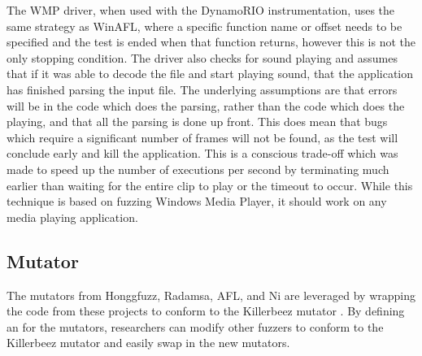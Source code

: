 The WMP driver, when used with the DynamoRIO instrumentation, uses the same strategy as WinAFL, where a specific function
name or offset needs to be specified and the test is ended when that function returns, however
this is not the only stopping condition. The driver also checks for sound
playing and assumes that if it was able to decode the file and start playing
sound, that the application has finished parsing the input file.
The underlying assumptions are that errors will be in the
code which does the parsing, rather than the code which does the playing, and that all
the parsing is done up front.  This does mean that bugs which require a
significant number of frames will not be found, as the test will conclude
early and kill the application.  This is a conscious trade-off which was made
to speed up the number of executions per second by terminating much earlier than
waiting for the entire clip to
play or the timeout to occur.  While this technique is based on fuzzing Windows Media Player,
it should work on any media playing application. 

\subsection{Mutator} \label{Mutator}
The mutators from Honggfuzz, Radamsa, AFL, and Ni are leveraged by wrapping the
code from these projects to conform to the Killerbeez mutator \API{}. By
defining an \API{} for the mutators, researchers can modify other
fuzzers to conform to the Killerbeez mutator \API{} and easily swap in the new mutators.

